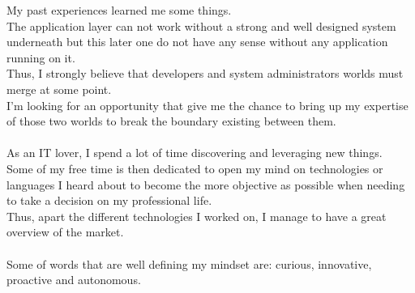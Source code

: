 
\begin{cvparagraph}
    My past experiences learned me some things.\\
    The application layer can not work without a strong and well designed system underneath but this later one do not have any sense without any application running on it.\\
    Thus, I strongly believe that developers and system administrators worlds must merge at some point.\\
    I’m looking for an opportunity that give me the chance to bring up my expertise of those two worlds to break the boundary existing between them.\\
    \\
    As an IT lover, I spend a lot of time discovering and leveraging new things. \\
    Some of my free time is then dedicated to open my mind on technologies or languages I heard about to become the more objective as possible when needing to take a decision on my professional life. \\
    Thus, apart the different technologies I worked on, I manage to have a great overview of the market. \\
    \\
    Some of words that are well defining my mindset are: curious, innovative, proactive and autonomous. \\
\end{cvparagraph}